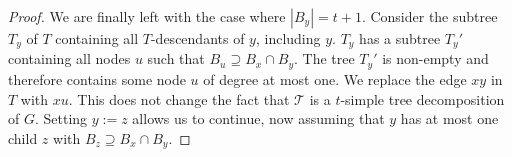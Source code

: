 \documentclass[kpfonts]{patmorin}
\theoremstyle{named}
\begin{document}
\begin{proof}

    We are finally left with the case where $|B_y|=t+1$.
    Consider the subtree $T_y$ of $T$ containing all $T$-descendants of $y$, including $y$.  $T_y$ has a subtree $T_y'$ containing all nodes $u$ such that $B_u\supseteq B_x\cap B_y$.  The tree $T_y'$ is non-empty and therefore contains some node $u$ of degree at most one.  We replace the edge $xy$ in $T$ with $xu$.  This does not change the fact that $\mathcal{T}$ is a $t$-simple tree decomposition of $G$.  Setting $y:=z$ allows us to continue, now assuming that $y$ has at most one child $z$ with $B_z\supseteq B_x\cap B_y$.


\end{proof}
\end{document}
